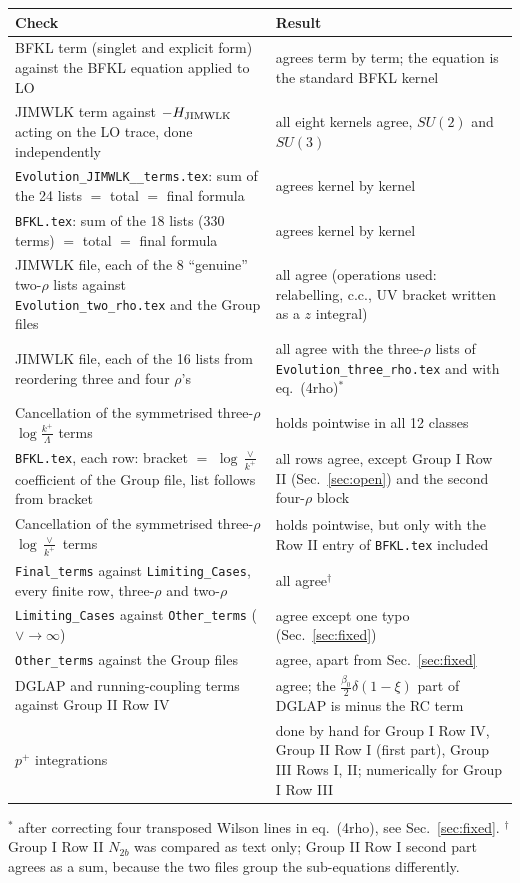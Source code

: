 \documentclass[10pt]{article}
\newcommand{\LL}{\log\frac{k^{+}}{\Lambda}}
\newcommand{\LV}{\log\frac{\vee}{k^{+}}}
\begin{document}
\begin{center}
\begin{tabular}{p{}p{}}
\toprule
Check & Result\\
\midrule
BFKL term (singlet and explicit form) against the BFKL equation applied to LO & agrees term by term; the equation is the standard BFKL kernel\\
JIMWLK term against $-H_{\rm JIMWLK}$ acting on the LO trace, done independently & all eight kernels agree, $SU(2)$ and $SU(3)$\\
\texttt{Evolution\_JIMWLK\_\_terms.tex}: sum of the 24 lists $=$ total $=$ final formula & agrees kernel by kernel\\
\texttt{BFKL.tex}: sum of the 18 lists (330 terms) $=$ total $=$ final formula & agrees kernel by kernel\\
JIMWLK file, each of the 8 ``genuine'' two-$\rho$ lists against \texttt{Evolution\_two\_rho.tex} and the Group files & all agree (operations used: relabelling, c.c., UV bracket written as a $z$ integral)\\
JIMWLK file, each of the 16 lists from reordering three and four $\rho$'s & all agree with the three-$\rho$ lists of \texttt{Evolution\_three\_rho.tex} and with eq.~(4rho)$^{\ast}$\\
Cancellation of the symmetrised three-$\rho$ $\LL$ terms & holds pointwise in all 12 classes\\
\texttt{BFKL.tex}, each row: bracket $=$ $\LV$ coefficient of the Group file, list follows from bracket & all rows agree, except Group I Row II (Sec.~\ref{sec:open}) and the second four-$\rho$ block\\
Cancellation of the symmetrised three-$\rho$ $\LV$ terms & holds pointwise, but only with the Row II entry of \texttt{BFKL.tex} included\\
\texttt{Final\_terms} against \texttt{Limiting\_Cases}, every finite row, three-$\rho$ and two-$\rho$ & all agree$^{\dagger}$\\
\texttt{Limiting\_Cases} against \texttt{Other\_terms} ($\vee\to\infty$) & agree except one typo (Sec.~\ref{sec:fixed})\\
\texttt{Other\_terms} against the Group files & agree, apart from Sec.~\ref{sec:fixed}\\
DGLAP and running-coupling terms against Group II Row IV & agree; the $\frac{\beta_{0}}{2}\delta(1-\xi)$ part of DGLAP is minus the RC term\\
$p^{+}$ integrations & done by hand for Group I Row IV, Group II Row I (first part), Group III Rows I, II; numerically for Group I Row III\\
\bottomrule
\end{tabular}
\end{center}
{\small $^{\ast}$ after correcting four transposed Wilson lines in eq.~(4rho), see Sec.~\ref{sec:fixed}. $^{\dagger}$ Group I Row II $N_{2b}$ was compared as text only; Group II Row I second part agrees as a sum, because the two files group the sub-equations differently.}
\end{document}
